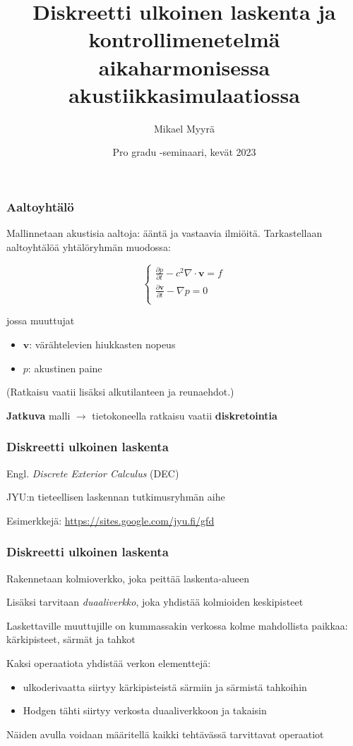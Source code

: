 \documentclass{beamer}
\title{Diskreetti ulkoinen laskenta ja kontrollimenetelmä aikaharmonisessa akustiikkasimulaatiossa}
\author{Mikael Myyrä}
\date{Pro gradu -seminaari, kevät 2023}
\begin{document}
\frame{\titlepage}

\begin{frame}
  \frametitle{Aaltoyhtälö}

  Mallinnetaan akustisia aaltoja: ääntä ja vastaavia ilmiöitä.
  Tarkastellaan aaltoyhtälöä yhtälöryhmän muodossa:

  \[
    \begin{cases}
      \frac{\partial p}{\partial t} - c^2\nabla \cdot \mathbf{v} = f \\
      \frac{\partial \mathbf{v}}{\partial t} - \nabla p = 0 \\
    \end{cases}
  \]

  \pause

  jossa muuttujat
  \begin{itemize}
    \item $\mathbf{v}$: värähtelevien hiukkasten nopeus
    \item $p$: akustinen paine
  \end{itemize}

  (Ratkaisu vaatii lisäksi alkutilanteen ja reunaehdot.)

  \pause

  \textbf{Jatkuva} malli
  $\rightarrow$ tietokoneella ratkaisu vaatii \textbf{diskretointia}
\end{frame}

\begin{frame}
  \frametitle{Diskreetti ulkoinen laskenta}

  Engl. \textit{Discrete Exterior Calculus} (DEC)

  JYU:n tieteellisen laskennan tutkimusryhmän aihe

  Esimerkkejä: \url{https://sites.google.com/jyu.fi/gfd}
\end{frame}

\begin{frame}
  \frametitle{Diskreetti ulkoinen laskenta}

  Rakennetaan kolmioverkko, joka peittää laskenta-alueen

  \pause

  Lisäksi tarvitaan \textit{duaaliverkko}, joka yhdistää kolmioiden keskipisteet

  \pause

  Laskettaville muuttujille on kummassakin verkossa kolme mahdollista paikkaa:
  kärkipisteet, särmät ja tahkot

  \pause

  Kaksi operaatiota yhdistää verkon elementtejä:
  \begin{itemize}
    \item ulkoderivaatta siirtyy kärkipisteistä särmiin ja särmistä tahkoihin
    \item Hodgen tähti siirtyy verkosta duaaliverkkoon ja takaisin
  \end{itemize}

  Näiden avulla voidaan määritellä kaikki tehtävässä tarvittavat operaatiot
\end{frame}
\end{document}
